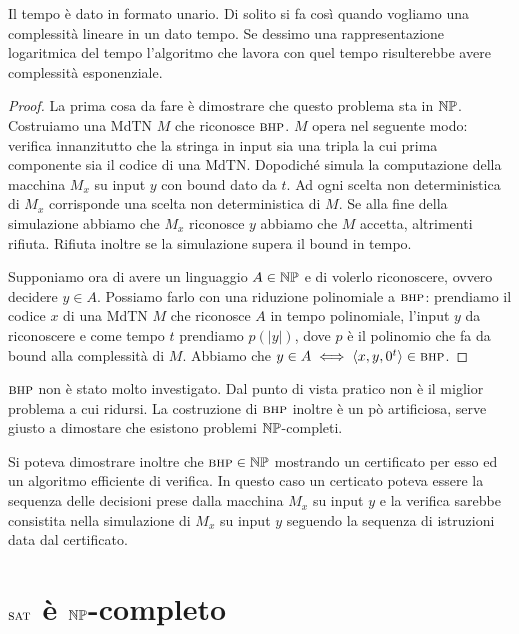 Il tempo è dato in formato unario. Di solito si fa così quando vogliamo una complessità lineare
in un dato tempo.  Se dessimo una rappresentazione logaritmica del tempo l'algoritmo che lavora con
quel tempo risulterebbe avere complessità esponenziale.

\begin{proof}
    La prima cosa da fare è dimostrare che questo problema sta in $\mathbb{NP}$. Costruiamo una MdTN
    $M$ che riconosce $\textsc{bhp}$. $M$ opera nel seguente modo: verifica innanzitutto che la stringa in
    input sia una tripla la cui prima componente sia il codice di una MdTN. Dopodiché simula la
    computazione della macchina $M_{x}$ su input $y$ con bound dato da $t$. Ad ogni scelta non
    deterministica di $M_{x}$ corrisponde una scelta non deterministica di $M$. Se alla fine della
    simulazione abbiamo che $M_{x}$ riconosce $y$ abbiamo che $M$ accetta, altrimenti rifiuta.
    Rifiuta inoltre se la simulazione supera il bound in tempo.

    Supponiamo ora di avere un linguaggio $A \in \mathbb{NP}$ e di volerlo riconoscere, ovvero decidere
    $y \in A$.  Possiamo farlo con una riduzione polinomiale a $\textsc{bhp}$: prendiamo il codice $x$ di
    una MdTN $M$ che riconosce $A$ in tempo polinomiale, l'input $y$ da riconoscere e come tempo $t$
    prendiamo $p(|y|)$, dove $p$ è il polinomio che fa da bound alla complessità di $M$. Abbiamo
    che $y \in A \iff \langle x,y,0^{t} \rangle \in \textsc{bhp}$.
\end{proof}

$\textsc{bhp}$ non è stato molto investigato. Dal punto di vista pratico non è il miglior problema a cui
ridursi. La costruzione di $\textsc{bhp}$ inoltre è un pò artificiosa, serve giusto a dimostare che
esistono problemi $\mathbb{NP}$-completi.

Si poteva dimostrare inoltre che $\textsc{bhp} \in \mathbb{NP}$ mostrando un certificato per esso ed un
algoritmo efficiente di verifica. In questo caso un certicato poteva essere la sequenza delle
decisioni prese dalla macchina $M_{x}$ su input $y$ e la verifica sarebbe consistita nella
simulazione di $M_{x}$ su input $y$ seguendo la sequenza di istruzioni data dal certificato.


\section{$\textsc{sat}$ è $\mathbb{NP}$-completo}


